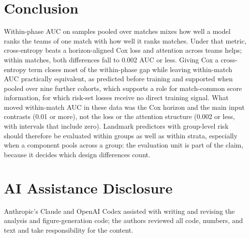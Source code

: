 \documentclass[sigconf,anonymous]{acmart}
\begin{document}
\section{Conclusion}
\label{sec:conclusion}
Within-phase AUC on samples pooled over matches mixes how well a model ranks the teams of one match with how well it ranks matches. Under that metric, cross-entropy beats a horizon-aligned Cox loss and attention across teams helps; within matches, both differences fall to 0.002 AUC or less. Giving Cox a cross-entropy term closes most of the within-phase gap while leaving within-match AUC practically equivalent, as predicted before training and supported when pooled over nine further cohorts, which supports a role for match-common score information, for which risk-set losses receive no direct training signal. What moved within-match AUC in these data was the Cox horizon and the main input contrasts (0.01 or more), not the loss or the attention structure (0.002 or less, with intervals that include zero). Landmark predictors with group-level risk should therefore be evaluated within groups as well as within strata, especially when a component pools across a group: the evaluation unit is part of the claim, because it decides which design differences count.

\section*{AI Assistance Disclosure}
Anthropic's Claude and OpenAI Codex assisted with writing and revising the analysis and figure-generation code; the authors reviewed all code, numbers, and text and take responsibility for the content.



\end{document}
